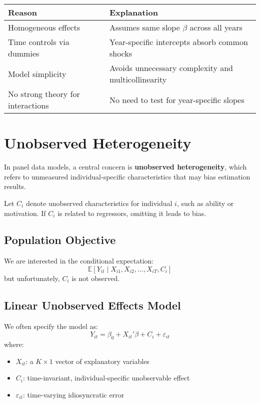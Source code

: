 \documentclass[12pt, oneside]{article}
\begin{document}
\begin{center}
\begin{tabular}{@{}ll@{}}
\toprule
\textbf{Reason} & \textbf{Explanation} \\
\midrule
Homogeneous effects & Assumes same slope \( \beta \) across all years \\
Time controls via dummies & Year-specific intercepts absorb common shocks \\
Model simplicity & Avoids unnecessary complexity and multicollinearity \\
No strong theory for interactions & No need to test for year-specific slopes \\
\bottomrule
\end{tabular}
\end{center}

\section*{Unobserved Heterogeneity}

In panel data models, a central concern is \textbf{unobserved heterogeneity}, which refers to unmeasured individual-specific characteristics that may bias estimation results.

Let \( C_i \) denote unobserved characteristics for individual \( i \), such as ability or motivation. If \( C_i \) is related to regressors, omitting it leads to bias.

\subsection*{Population Objective}

We are interested in the conditional expectation:
\[
\mathbb{E}[Y_{it} \mid X_{i1}, X_{i2}, \dots, X_{iT}, C_i]
\]
but unfortunately, \( C_i \) is not observed.

\subsection*{Linear Unobserved Effects Model}

We often specify the model as:
\[
Y_{it} = \beta_0 + X_{it}' \beta + C_i + \varepsilon_{it}
\]
where:
\begin{itemize}
    \item \( X_{it} \): a \( K \times 1 \) vector of explanatory variables
    \item \( C_i \): time-invariant, individual-specific unobservable effect
    \item \( \varepsilon_{it} \): time-varying idiosyncratic error
\end{itemize}
\end{document}
